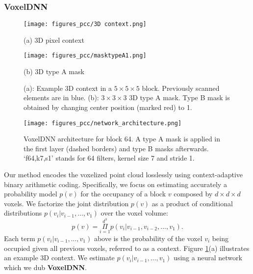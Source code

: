 
\subsubsection{VoxelDNN}\label{ssec:voxelDNN}

\begin{figure}
\captionsetup{singlelinecheck = false, format= hang, justification=raggedright, font=small, labelsep=space}
\begin{minipage}[b]{.45\linewidth}
  \centering
  \centerline{\texttt{[image: figures\_pcc/3D context.png]}}
  \centerline{(a) 3D pixel context}\medskip
\end{minipage}
\hfill
\begin{minipage}[b]{0.45\linewidth}
\label{sfig:typeA}
  \centering
  \centerline{\texttt{[image: figures\_pcc/masktypeA1.png]}}
  \centerline{(b) 3D type A mask }\medskip
\end{minipage}
\caption{(a): Example 3D context in a $5 \times 5 \times 5$ block. Previously scanned elements are in blue. (b): $3 \times 3 \times 3$ 3D type A mask. Type B mask is obtained by changing center position (marked red) to 1. }
\label{fig:context}
\end{figure}
%
\begin{figure}[tb]
\captionsetup{singlelinecheck = false, format= hang, justification=raggedright, font=small, labelsep=space}
\centering
\texttt{[image: figures\_pcc/network\_architecture.png]}
\caption{VoxelDNN architecture for block 64. A type A mask is applied in the first layer (dashed borders) and type B masks afterwards. `f64,k7,s1' stands for 64 filters, kernel size 7 and stride 1. }
\label{fig:Networkarchitecture}
\end{figure}
\setlength{\textfloatsep}{20pt}%


\par Our method encodes the voxelized point cloud losslessly using context-adaptive binary arithmetic coding. Specifically, we focus on estimating accurately a probability model $p(v)$  for the occupancy of a block $v$ composed by $d \times d \times d$ voxels. We factorize the joint distribution $p(v)$ as a product of conditional distributions $p(v_i|v_{i-1}, \ldots, v_1)$ over the voxel volume: 
\begin{equation}
    p(v)= \underset{i=1 }{\overset{d^3}{\Pi}}p(v_i|v_{i-1},v_{i-2},\ldots,v_{1}).
    \label{eq:p(v)}
\end{equation}
Each term $p(v_i|v_{i-1}, \ldots, v_1)$ above is the probability of the voxel $v_{i}$ being occupied given all previous voxels,  referred to as a context. Figure \ref{fig:context}(a) illustrates an example 3D context. We estimate $p(v_i|v_{i-1}, \ldots, v_1)$ using a neural network which we dub \textbf{VoxelDNN}.  

